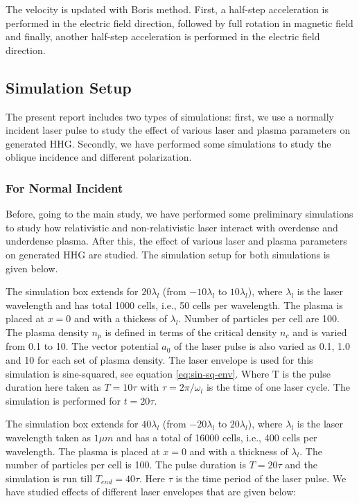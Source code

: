 The velocity is updated with Boris method. First, a half-step acceleration is performed in the electric field direction, followed by full rotation in magnetic field and finally, another half-step acceleration is performed in the electric field direction.

\subsection{Simulation Setup}
The present report includes two types of simulations: first, we use a normally incident laser pulse to study the effect of various laser and plasma parameters on generated HHG. Secondly, we have performed some simulations to study the oblique incidence and different polarization.

\subsubsection{For Normal Incident}
Before, going to the main study, we have performed some preliminary simulations to study how relativistic and non-relativistic laser interact with overdense and underdense plasma. After this, the effect of various laser and plasma parameters on generated HHG are studied. The simulation setup for both simulations is given below.

\label{sec:preliminary}
The simulation box extends for $20 \lambda _l$ (from $-10 \lambda _l$ to $10 \lambda _l$), where $\lambda_l$ is the laser wavelength and has total 1000 cells, i.e., 50 cells per wavelength. The plasma is placed at $x=0$ and with a thickess of $\lambda_l$. Number of particles per cell are 100.  The plasma density $n_p$ is defined in terms of the critical density $n_c$ and is varied from 0.1 to 10. The vector potential $a_0$ of the laser pulse is also varied as 0.1, 1.0 and 10 for each set of plasma density. The laser envelope is used for this simulation is sine-squared, see equation \ref{eq:sin-sq-env}. Where T is the pulse duration here taken as $T=10\tau$ with $\tau = 2\pi/\omega_l$ is the time of one laser cycle. The simulation is performed for $t=20\tau$.

\label{sec:normal_hhg}
The simulation box extends for $40 \lambda _l$ (from $-20 \lambda _l$ to $20 \lambda _l$), where $\lambda_l$ is the laser wavelength taken as $1\mu m$ and has a total of 16000 cells, i.e., 400 cells per wavelength. The plasma is placed at $x=0$ and with a thickness of $\lambda_l$. The number of particles per cell is 100. The pulse duration is $T = 20 \tau$ and the simulation is run till $T_{end} = 40 \tau$. Here $\tau$ is the time period of the laser pulse. We have studied effects of different laser envelopes that are given below:

